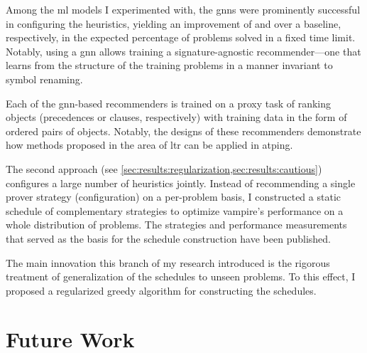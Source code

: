 Among the \gls{ml} models I experimented with,
the \glspl{gnn} were prominently successful in configuring the heuristics,
yielding an improvement of  and  over a baseline, respectively, in the expected percentage of problems solved in a fixed time limit.
Notably, using a \gls{gnn} allows training a signature-agnostic recommender---one that learns from the structure of the training problems in a manner invariant to symbol renaming.

Each of the \acrshort{gnn}-based recommenders is trained on a proxy task of ranking objects (precedences or clauses, respectively)
with training data in the form of ordered pairs of objects.
Notably, the designs of these recommenders demonstrate how methods proposed in the area of \acrlong{ltr}
can be applied in \gls{atping}.

The second approach (see \cref{sec:results:regularization,sec:results:cautious}) configures a large number of heuristics jointly.
Instead of recommending a single prover strategy (configuration) on a per-problem basis,
I constructed a static schedule of complementary strategies to optimize \gls{vampire}'s performance on a whole distribution of problems.
The strategies and performance measurements that served as the basis for the schedule construction have been published.

The main innovation this branch of my research introduced is the rigorous treatment of generalization of the schedules to unseen problems.
To this effect, I proposed a regularized greedy algorithm for constructing the schedules.


\section{Future Work}


